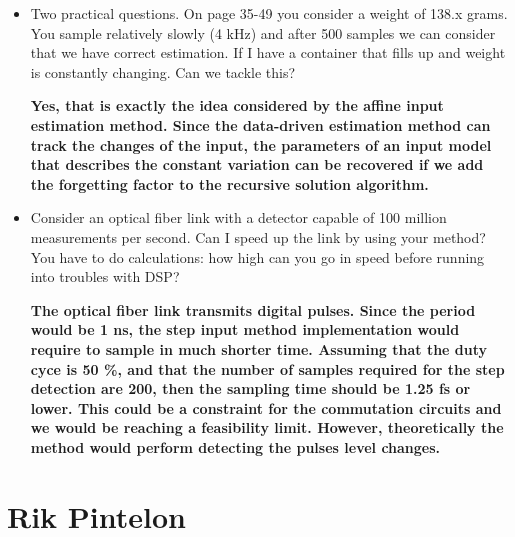 \documentclass[11pt]{article}
\begin{document}
\begin{itemize}
	\item Two practical questions. On page 35-49 you consider a weight of 138.x grams. You sample relatively slowly (4 kHz) and after 500 samples we can consider that we have correct estimation. If I have a container that fills up and weight is constantly changing. Can we tackle this?
	
	{\bfseries Yes, that is exactly the idea considered by the affine input estimation method. Since the data-driven estimation method can track the changes of the input, the parameters of an input model that describes the constant variation can be recovered if we add the forgetting factor to the recursive solution algorithm. }
	
	\item  Consider an optical fiber link with a detector capable of 100 million measurements per second. Can I speed up the link by using your method? You have to do calculations: how high can you go in speed before running into troubles with DSP?
	
	{\bfseries The optical fiber link transmits digital pulses. Since the period would be 1 ns, the step input method implementation would require to sample in much shorter time. Assuming that the duty cyce is 50 \%, and that the number of samples required for the step detection are 200, then the sampling time should be 1.25 fs or lower. This could be a constraint for the commutation circuits and we would be reaching a feasibility limit. However, theoretically the method would perform detecting the pulses level changes.  }
	
\end{itemize}

\section*{Rik Pintelon}
\end{document}
